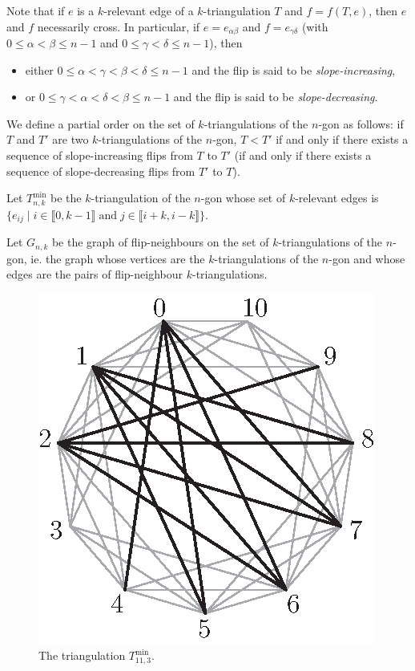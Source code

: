 \documentclass[12pt]{amsart}
\begin{document}
Note that if $e$ is a $k$-relevant edge of a $k$-triangulation $T$ and $f=f(T,e)$, then $e$ and $f$ necessarily cross.
In particular, if $e=e_{\alpha\beta}$ and $f=e_{\gamma\delta}$ (with $0\le\alpha<\beta\le n-1$ and $0\le\gamma<\delta\le n-1$), then
\begin{itemize}
\item either $0\le\alpha<\gamma<\beta<\delta\le n-1$ and the flip is said to be \emph{slope-increasing},
\item or $0\le\gamma<\alpha<\delta<\beta\le n-1$ and the flip is said to be \emph{slope-decreasing}.
\end{itemize}
We define a partial order on the set of $k$-triangulations of the $n$-gon as follows: if $T$ and $T'$ are two $k$-triangulations of the $n$-gon, $T<T'$ if and only if there exists a sequence of slope-increasing flips from $T$ to $T'$ (if and only if there exists a sequence of slope-decreasing flips from $T'$ to $T$).

Let $T_{n,k}^{\min}$ be the $k$-triangulation of the $n$-gon whose set of $k$-relevant edges is $\{e_{ij}\;|\;i\in\llbracket 0,k-1\rrbracket\;\mathrm{and}\;j\in\llbracket i+k,i-k\rrbracket\}$.

Let $G_{n,k}$ be the graph of flip-neighbours on the set of $k$-triangulations of the $n$-gon, ie. the graph whose vertices are the $k$-triangulations of the $n$-gon and whose edges are the pairs of flip-neighbour $k$-triangulations.

\begin{figure}
\centerline{\includegraphics[scale=1]{min.eps}}
\caption{\small{The triangulation $T_{11,3}^{\min}$.}}\label{min}
\end{figure}
\end{document}
